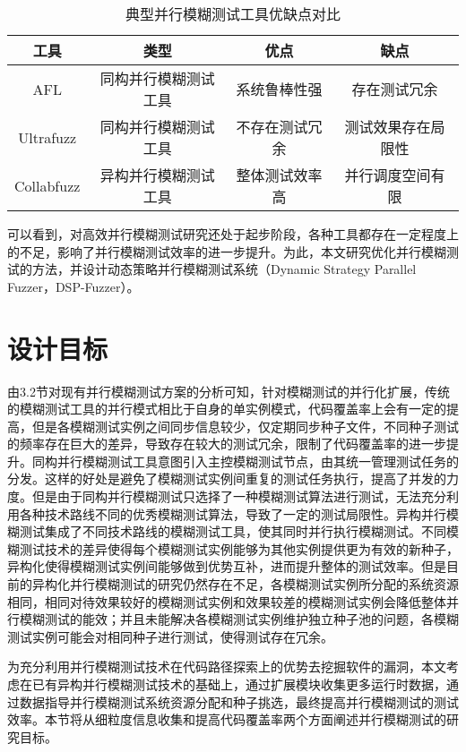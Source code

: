 \documentclass[master]{thesis-uestc}
\begin{document}
\begin{table}[!htbp]
    \caption{典型并行模糊测试工具优缺点对比}
    \begin{tabular}{cccc}
    \toprule
    工具& 类型 & 优点 & 缺点 \\
    \midrule
    AFL & 同构并行模糊测试工具 & 系统鲁棒性强 & 存在测试冗余 \\
    Ultrafuzz & 同构并行模糊测试工具 & 不存在测试冗余 & 测试效果存在局限性 \\
    Collabfuzz & 异构并行模糊测试工具 & 整体测试效率高 & 并行调度空间有限 \\
    \bottomrule
    \end{tabular}
    \label{table1}
    \vspace{6pt}
\end{table}

可以看到，对高效并行模糊测试研究还处于起步阶段，各种工具都存在一定程度上的不足，影响了并行模糊测试效率的进一步提升。为此，本文研究优化并行模糊测试的方法，并设计动态策略并行模糊测试系统（Dynamic Strategy Parallel Fuzzer，DSP-Fuzzer）。

\section{设计目标}
由3.2节对现有并行模糊测试方案的分析可知，针对模糊测试的并行化扩展，传统的模糊测试工具的并行模式相比于自身的单实例模式，代码覆盖率上会有一定的提高，但是各模糊测试实例之间同步信息较少，仅定期同步种子文件，不同种子测试的频率存在巨大的差异，导致存在较大的测试冗余，限制了代码覆盖率的进一步提升。同构并行模糊测试工具意图引入主控模糊测试节点，由其统一管理测试任务的分发。这样的好处是避免了模糊测试实例间重复的测试任务执行，提高了并发的力度。但是由于同构并行模糊测试只选择了一种模糊测试算法进行测试，无法充分利用各种技术路线不同的优秀模糊测试算法，导致了一定的测试局限性。异构并行模糊测试集成了不同技术路线的模糊测试工具，使其同时并行执行模糊测试。不同模糊测试技术的差异使得每个模糊测试实例能够为其他实例提供更为有效的新种子，异构化使得模糊测试实例间能够做到优势互补，进而提升整体的测试效率。但是目前的异构化并行模糊测试的研究仍然存在不足，各模糊测试实例所分配的系统资源相同，相同对待效果较好的模糊测试实例和效果较差的模糊测试实例会降低整体并行模糊测试的能效；并且未能解决各模糊测试实例维护独立种子池的问题，各模糊测试实例可能会对相同种子进行测试，使得测试存在冗余。

为充分利用并行模糊测试技术在代码路径探索上的优势去挖掘软件的漏洞，本文考虑在已有异构并行模糊测试技术的基础上，通过扩展模块收集更多运行时数据，通过数据指导并行模糊测试系统资源分配和种子挑选，最终提高并行模糊测试的测试效率。本节将从细粒度信息收集和提高代码覆盖率两个方面阐述并行模糊测试的研究目标。
\end{document}
